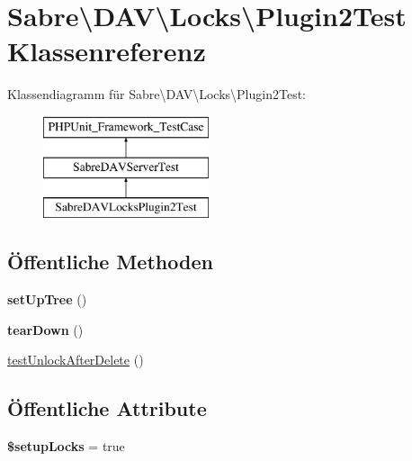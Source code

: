 \hypertarget{class_sabre_1_1_d_a_v_1_1_locks_1_1_plugin2_test}{}\section{Sabre\textbackslash{}D\+AV\textbackslash{}Locks\textbackslash{}Plugin2\+Test Klassenreferenz}
\label{class_sabre_1_1_d_a_v_1_1_locks_1_1_plugin2_test}
Klassendiagramm für Sabre\textbackslash{}D\+AV\textbackslash{}Locks\textbackslash{}Plugin2\+Test\+:\begin{figure}[H]
\begin{center}
\leavevmode
\includegraphics[height=3.000000cm]{class_sabre_1_1_d_a_v_1_1_locks_1_1_plugin2_test}
\end{center}
\end{figure}
\subsection*{Öffentliche Methoden}
\begin{DoxyCompactItemize}
\item 
\mbox{\label{class_sabre_1_1_d_a_v_1_1_locks_1_1_plugin2_test_a2fd774c12c9b901de11c9520548206e3}} 
{\bfseries set\+Up\+Tree} ()
\item 
\mbox{\label{class_sabre_1_1_d_a_v_1_1_locks_1_1_plugin2_test_a000697e84959b5e333b55f089dd45f35}} 
{\bfseries tear\+Down} ()
\item 
\mbox{\hyperlink{class_sabre_1_1_d_a_v_1_1_locks_1_1_plugin2_test_a513abb3279461b360cd187eb63211779}{test\+Unlock\+After\+Delete}} ()
\end{DoxyCompactItemize}
\subsection*{Öffentliche Attribute}
\begin{DoxyCompactItemize}
\item 
\mbox{\label{class_sabre_1_1_d_a_v_1_1_locks_1_1_plugin2_test_abba71d91d7b5ff8d81789aaf436a2e57}} 
{\bfseries \$setup\+Locks} = true
\end{DoxyCompactItemize}
